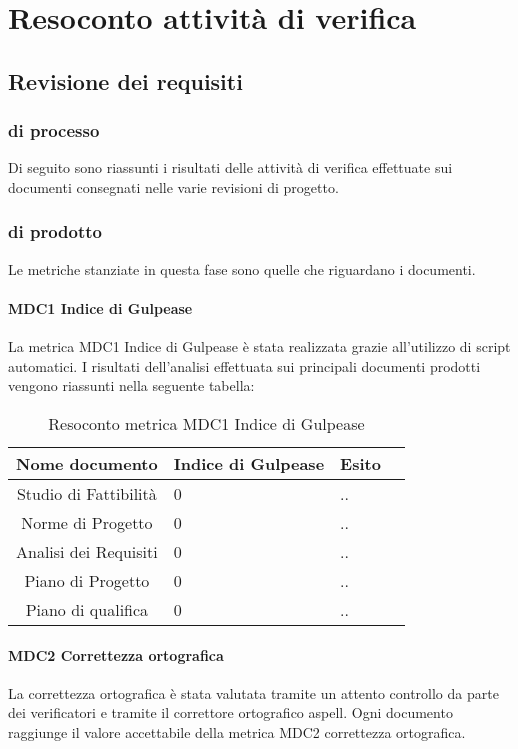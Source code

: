 \section{Resoconto attività di verifica}

\subsection{Revisione dei requisiti}

\subsubsection{ di processo}

Di seguito sono riassunti i risultati delle attività di verifica effettuate sui documenti consegnati nelle varie revisioni di progetto.

\subsubsection{ di prodotto}

Le metriche stanziate in questa fase sono quelle che riguardano i documenti.

\paragraph{MDC1 Indice di Gulpease}

La metrica MDC1 Indice di Gulpease è stata realizzata grazie all'utilizzo di script automatici. I risultati dell'analisi effettuata sui principali documenti prodotti vengono riassunti nella seguente tabella:

\begin{table}[H]
		\begin{center}
			\setlength{\aboverulesep}{0pt}
			\setlength{\belowrulesep}{0pt}
			\setlength{\extrarowheight}{.75ex}
			\begin{tabular}{ c C{4cm} C{2cm} C{3cm} }
				\textbf{Nome documento} & \textbf{Indice di Gulpease} & \textbf{Esito} \\
				\toprule
		Studio di Fattibilità & 0 & ..\\
		Norme di Progetto & 0 & ..\\
		Analisi dei Requisiti & 0 & ..\\
		Piano di Progetto & 0 & ..\\
		Piano di qualifica & 0 & ..\\
			
		\bottomrule
			\end{tabular}
			\caption{Resoconto metrica MDC1 Indice di Gulpease}
		\end{center}
	\end{table}
	
\paragraph{MDC2 Correttezza ortografica}

La correttezza ortografica è stata valutata tramite un attento controllo da parte dei verificatori e tramite il correttore ortografico aspell.  Ogni documento raggiunge il valore accettabile della metrica MDC2 correttezza ortografica. 

